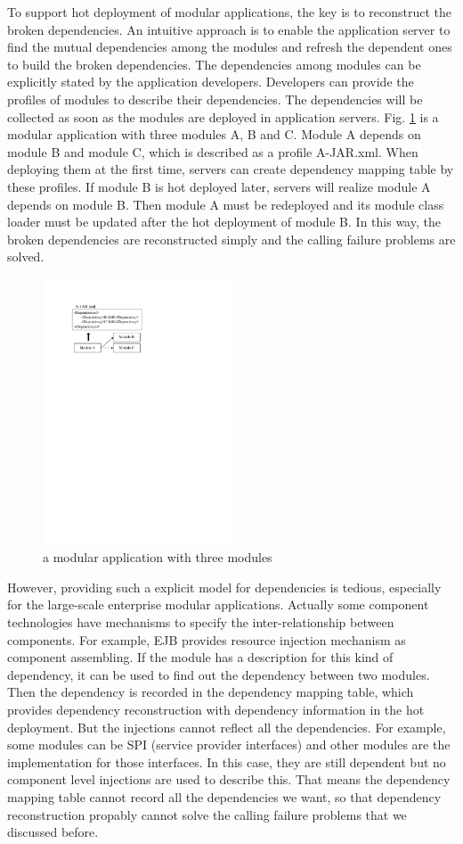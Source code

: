 \documentclass[conference]{IEEEtran}
\begin{document}
To support hot deployment of modular applications, the key is to reconstruct the broken dependencies. An intuitive approach is to enable the application server to find the mutual dependencies among the modules and refresh the dependent ones to build the broken dependencies. The dependencies among modules can be explicitly stated by the application developers. Developers can provide the profiles of modules to describe their dependencies. The dependencies will be collected as soon as the modules are deployed in application servers. Fig. \ref{fig:example_abc} is a modular application with three modules A, B and C. Module A depends on module B and module C, which is described as a profile A-JAR.xml. When deploying them at the first time, servers can create dependency mapping table by these profiles. If module B is hot deployed later, servers will realize module A depends on module B. Then module A must be redeployed and its module class loader must be updated after the hot deployment of module B. In this way, the broken dependencies are reconstructed simply and the calling failure problems are solved.

\begin{figure}[ht]
\centering
\includegraphics[width=2.2in]{ExampleThree.pdf}
\caption{a modular application with three modules}
\label{fig:example_abc}
\end{figure}


However, providing such a explicit model for dependencies is tedious, especially for the large-scale enterprise modular applications. Actually some component technologies have mechanisms to specify the inter-relationship between components. For example, EJB provides resource injection mechanism\cite{DI} as component assembling. If the module has a description for this kind of dependency, it can be used to find out the dependency between two modules. Then the dependency is recorded in the dependency mapping table, which provides dependency reconstruction with dependency information in the hot deployment. But the injections cannot reflect all the dependencies. For example, some modules can be SPI (service provider interfaces) and other modules are the implementation for those interfaces. In this case, they are still dependent but no component level injections are used to describe this. That means the dependency mapping table cannot record all the dependencies we want, so that dependency reconstruction propably cannot solve the calling failure problems that we discussed before.
\end{document}
